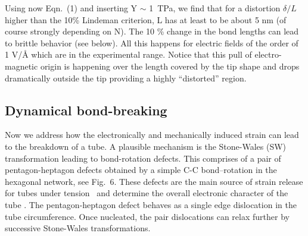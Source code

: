 \begin{multicols}{2}
Using now Eqn.~(1) and inserting Y $\sim$ 1~TPa, we find that for
a distortion $\delta /L$ higher than the 10\% Lindeman criterion,
L has at least to be about 5 nm (of course strongly depending on
N). The 10 \% change in the bond lengths can lead to brittle
behavior (see below)\cite{Marco}. All this happens for electric
fields of the order of 1 V/{\AA } which are in the experimental
range. Notice that this pull of electro-magnetic origin is
happening over the length covered by the tip shape and drops
dramatically outside the tip providing a highly ``distorted''
region.

\subsection{Dynamical bond-breaking}

Now we address how the electronically and mechanically induced
strain can lead to the breakdown of a tube. A plausible mechanism
is the Stone-Wales (SW) transformation leading to bond-rotation
defects\cite{SW}. This comprises of a pair of pentagon-heptagon
defects obtained by a simple C-C bond--rotation in the hexagonal
network, see Fig.~6. These defects are the main source of strain
release for tubes under tension~\cite{Marco,Paul} and determine
the overall electronic character of the tube \cite{Vin}. The
pentagon-heptagon defect behaves as a single edge dislocation in
the tube circumference. Once nucleated, the pair dislocations can
relax further by successive Stone-Wales transformations.


\end{multicols}
